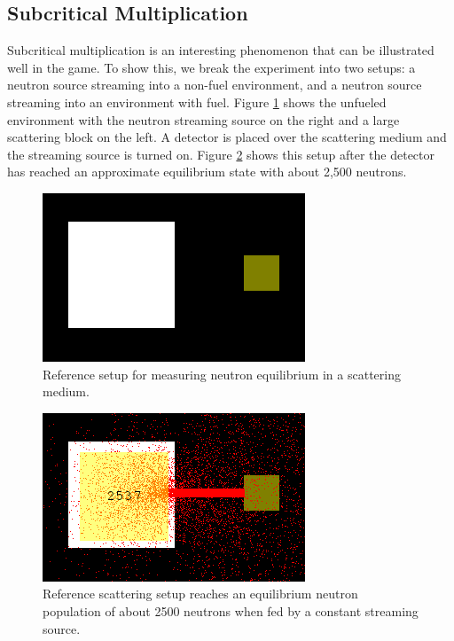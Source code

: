 \documentclass{anstrans}
\begin{document}
\subsection{Subcritical Multiplication}

Subcritical multiplication is an interesting phenomenon that can be
illustrated well in the game.  To show this, we break the experiment into two
setups: a neutron source streaming into a non-fuel environment, and a neutron
source streaming into an environment with fuel.  Figure
\ref{fig:scatter-setup} shows the unfueled environment with the neutron
streaming source on the right and a large scattering block on the left.  A
detector is placed over the scattering medium and the streaming source is
turned on. Figure \ref{fig:scatter-equil} shows this setup after the detector
has reached an approximate equilibrium state with about 2,500 neutrons.

\begin{figure}
    \centering
    \includegraphics{scatter-setup.png}
    \caption{Reference setup for measuring neutron equilibrium in a scattering medium.}
    \label{fig:scatter-setup}
\end{figure}

\begin{figure}
    \centering
    \includegraphics{scatter-equil.png}
    \caption{Reference scattering setup reaches an equilibrium neutron population of about 2500 neutrons when fed by a constant streaming source.}
    \label{fig:scatter-equil}
\end{figure}
\end{document}
